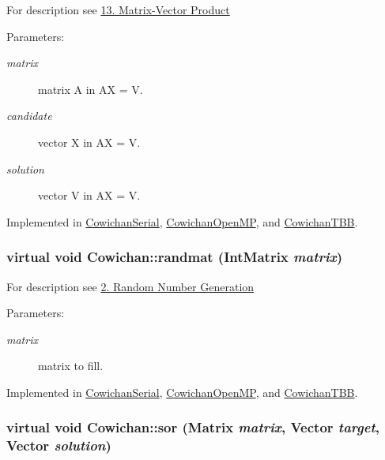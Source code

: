 For description see \hyperlink{index_product_sec}{13. Matrix-Vector Product} \begin{Desc}
\item[Parameters:]
\begin{description}
\item[{\em matrix}]matrix A in AX = V. \item[{\em candidate}]vector X in AX = V. \item[{\em solution}]vector V in AX = V. \end{description}
\end{Desc}


Implemented in \hyperlink{class_cowichan_serial_00411b35445d7d3038b96d53e43bdffa}{CowichanSerial}, \hyperlink{class_cowichan_open_m_p_41d0067382570d1e784f62f2c5963d49}{CowichanOpenMP}, and \hyperlink{class_cowichan_t_b_b_f3144458520e2dff1f9fad5753f6fc3d}{CowichanTBB}.\hypertarget{class_cowichan_c44cacf9d9e363a5b076bcee8b9a7a73}{
\subsubsection[{randmat}]{\setlength{\rightskip}{0pt plus 5cm}virtual void Cowichan::randmat ({\bf IntMatrix} {\em matrix})}}
\label{class_cowichan_c44cacf9d9e363a5b076bcee8b9a7a73}


For description see \hyperlink{index_randmat_sec}{2. Random Number Generation} \begin{Desc}
\item[Parameters:]
\begin{description}
\item[{\em matrix}]matrix to fill. \end{description}
\end{Desc}


Implemented in \hyperlink{class_cowichan_serial_2d24c0e562f7b109ec2ed916f38e5911}{CowichanSerial}, \hyperlink{class_cowichan_open_m_p_2c7c4e4dd96f82b7280a412c1fceed2c}{CowichanOpenMP}, and \hyperlink{class_cowichan_t_b_b_b9b5cb4b4b5dc8907b2a01825cd4aaff}{CowichanTBB}.\hypertarget{class_cowichan_92d8d9ae77208115fdfe69e1174f601c}{
\subsubsection[{sor}]{\setlength{\rightskip}{0pt plus 5cm}virtual void Cowichan::sor ({\bf Matrix} {\em matrix}, \/  {\bf Vector} {\em target}, \/  {\bf Vector} {\em solution})}}
\label{class_cowichan_92d8d9ae77208115fdfe69e1174f601c}


